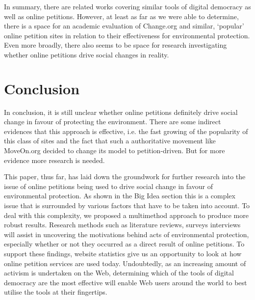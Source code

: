 In summary, there are related works covering similar tools of digital democracy as well as online petitions. However, at least as far as we were able to determine, there is a space for an academic evaluation of Change.org and similar, `popular' online petition sites in relation to their effectiveness for environmental protection. Even more broadly, there also seems to be space for research investigating whether online petitions drive social changes in reality.



\section{Conclusion}
\label{sec:conclusion}

In conclusion, it is still unclear whether online petitions definitely drive social change in favour of protecting the environment. There are some indirect evidences that this approach is effective, i.e. the fast growing of the popularity of this class of sites and the fact that such a authoritative movement like MoveOn.org decided to change its model to petition-driven. But for more evidence more research is needed.
\par\vspace{0.2cm}
This paper, thus far, has laid down the groundwork for further research into the issue of online petitions being used to drive social change in favour of environmental protection. As shown in the Big Idea section this is a complex issue that is surrounded by various factors that have to be taken into account. To deal with this complexity, we proposed a multimethod approach to produce more robust results. Research methods such as literature reviews, surveys interviews will assist in uncovering the motivations behind acts of environmental protection, especially whether or not they occurred as a direct result of online petitions. To support these findings, website statistics give us an opportunity to look at how online petition services are used today. Undoubtedly, as an increasing amount of activism is undertaken on the Web, determining which of the tools of digital democracy are the most effective will enable Web users around the world to best utilise the tools at their fingertips.









